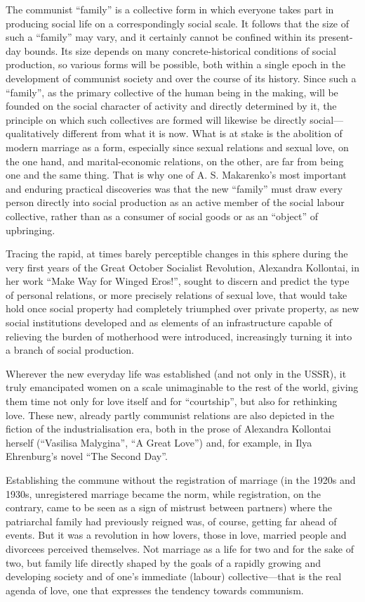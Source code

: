 \documentclass[../main]{subfiles}
\begin{document}
The communist “family” is a collective form in which everyone takes part in producing social life on a correspondingly social scale. It follows that the size of such a “family” may vary, and it certainly cannot be confined within its present-day bounds. Its size depends on many concrete-historical conditions of social production, so various forms will be possible, both within a single epoch in the development of communist society and over the course of its history. Since such a “family”, as the primary collective of the human being in the making, will be founded on the social character of activity and directly determined by it, the principle on which such collectives are formed will likewise be directly social—qualitatively different from what it is now. What is at stake is the abolition of modern marriage as a form, especially since sexual relations and sexual love, on the one hand, and marital-economic relations, on the other, are far from being one and the same thing. That is why one of A. S. Makarenko’s most important and enduring practical discoveries was that the new “family” must draw every person directly into social production as an active member of the social labour collective, rather than as a consumer of social goods or as an “object” of upbringing.

Tracing the rapid, at times barely perceptible changes in this sphere during the very first years of the Great October Socialist Revolution, Alexandra Kollontai, in her work “Make Way for Winged Eros!”, sought to discern and predict the type of personal relations, or more precisely relations of sexual love, that would take hold once social property had completely triumphed over private property, as new social institutions developed and as elements of an infrastructure capable of relieving the burden of motherhood were introduced, increasingly turning it into a branch of social production.

Wherever the new everyday life was established (and not only in the USSR), it truly emancipated women on a scale unimaginable to the rest of the world, giving them time not only for love itself and for “courtship”, but also for rethinking love. These new, already partly communist relations are also depicted in the fiction of the industrialisation era, both in the prose of Alexandra Kollontai herself (“Vasilisa Malygina”, “A Great Love”) and, for example, in Ilya Ehrenburg’s novel “The Second Day”.

Establishing the commune without the registration of marriage (in the 1920s and 1930s, unregistered marriage became the norm, while registration, on the contrary, came to be seen as a sign of mistrust between partners) where the patriarchal family had previously reigned was, of course, getting far ahead of events. But it was a revolution in how lovers, those in love, married people and divorcees perceived themselves. Not marriage as a life for two and for the sake of two, but family life directly shaped by the goals of a rapidly growing and developing society and of one’s immediate (labour) collective—that is the real agenda of love, one that expresses the tendency towards communism.
\end{document}
